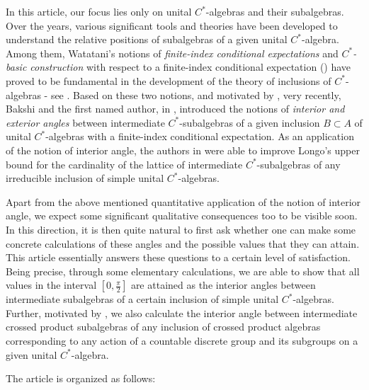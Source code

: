 \documentclass[a4]{amsart}
\numberwithin{equation}{section}
\begin{document}
In this article, our focus lies only on unital $C^*$-algebras and their
subalgebras. Over the years, various significant tools and theories
have been developed to understand the relative positions of
subalgebras of a given unital $C^*$-algebra. Among them, Watatani's
notions of {\em finite-index conditional expectations} and {\em
  $C^*$-basic construction} with respect to a finite-index conditional
expectation (\cite{Wat}) have proved to be fundamental in the
development of the theory of inclusions of $C^*$-algebras - see
\cite{Wat, MK, IW, Izumi, BG2}. Based on these two notions, and
motivated by \cite{BDLR}, very recently, Bakshi and the first named
author, in \cite{BG2}, introduced the notions of {\em interior and
  exterior angles} between intermediate $C^*$-subalgebras of a given
inclusion $B \subset A$ of unital $C^*$-algebras with a finite-index
conditional expectation. As an application of the notion of 
interior angle, the authors in \cite{BG2} were  able to improve
Longo's upper bound for the cardinality of the lattice of intermediate
$C^*$-subalgebras of any irreducible inclusion of simple unital
$C^*$-algebras.

Apart from the above mentioned quantitative application of the notion
of interior angle, we expect some significant qualitative consequences
too to be visible soon. In this direction, it is then quite natural to
first ask whether one can make some concrete calculations of these
angles and the possible values that they can attain. This article
essentially answers these questions to a certain level of
satisfaction. Being precise, through some elementary calculations, we
are able to show that all values in the interval $[0,\frac{\pi}{2}]$
are attained as the interior angles between intermediate subalgebras
of a certain inclusion of simple unital $C^*$-algebras. Further,
motivated by \cite{BG1}, we also calculate the interior angle between
intermediate crossed product subalgebras of any inclusion of crossed
product algebras corresponding to any action of a countable discrete
group and its subgroups on a given unital $C^*$-algebra.

The article is organized as follows:
\end{document}
